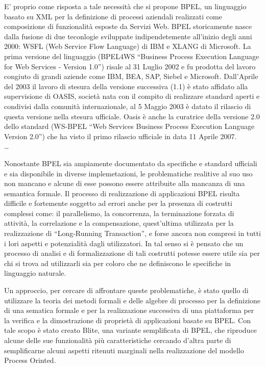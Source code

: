 E' proprio come risposta a tale necessità che si propone BPEL, un linguaggio
basato su XML per la definizione di processi aziendali realizzati come
composizione di funzionalità esposte da Servizi Web. BPEL storicamente nasce
dalla fusione di due teconlogie sviluppate indipendetemente all'inizio degli
anni 2000: WSFL (Web Service Flow Language) di IBM e XLANG di Microsoft. La
prima versione del linguaggio (BPEL4WS ``Business Process Execution Language for Web Services - Version 1.0'')
risale al 31 Luglio 2002 e fu prodotta del lavoro congiuto di grandi
aziende come IBM, BEA, SAP, Siebel e Microsoft. Dall'Aprile del 2003 il lavoro
di stesura della versione successiva (1.1) è stato affidato alla supervisione di
OASIS, società nata con il compito di realizzare standard aperti e condivisi
dalla comunità internazionale, al 5 Maggio 2003 è datato il rilascio di questa
versione nella stesura ufficiale. Oasis è  anche la curatrice della
versione 2.0 dello standard (WS-BPEL ``Web Services Business Process Execution
Language Version 2.0'') che ha visto il primo rilascio ufficiale in data
11 Aprile 2007.
\\
\ldots
\newpage

Nonostante BPEL sia ampiamente documentato da specifiche e standard ufficiali e
sia disponibile in diverse implemetazioni, le problematiche realitive al suo
uso non mancano e alcune di esse possono essere attribuite alla
mancanza di una semantica formale. Il processo di realizzazione di applicazioni BPEL
risulta difficile e fortemente soggetto ad errori anche per la presenza di
costrutti complessi come: il parallelismo, la concorrenza, la terminazione
forzata di attività, la correlazione e la compensazione, quest'ultima utilizzata
per la realizzazione di ``Long-Running Transaction'', e forse ancora non 
compresi in tutti i lori aspetti e potenzialità dagli utilizzatori. In tal
senso si è pensato che un processo di analisi e di formalizzazione di
tali costrutti potesse essere utile sia per chi si trova ad utilizzarli sia per
coloro che ne definiscono le specifiche in linguaggio naturale.

Un approccio, per cercare di affrontare queste problematiche, è stato quello di
utilizzare la teoria dei metodi formali e delle algebre di processo per la
definizione di una sematica formale e per la realizzazione successiva di una
piattaforma per la verifica e la dimostrazione di proprietà di applicazioni
basate su BPEL. Con tale scopo è stato creato Blite, una variante semplificata di
BPEL, che riproduce alcune delle sue funzionalità più caratteristiche cercando
d'altra parte di semplificarne alcuni aspetti ritenuti marginali nella
realizzazione del modello Process Orinted.
   
